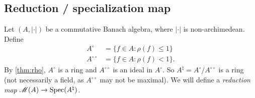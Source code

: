 \subsection{Reduction / specialization map}

Let $(A,|\cdot|)$ be a commutative Banach algebra, where $|\cdot|$ is 
non-archimedean. Define 
\begin{align*}
	A^\circ &= \{f\in A\colon \rho(f)\leqslant 1\} \\
	A^{\circ\circ} &= \{f\in A\colon \rho(f)<1\} .
\end{align*}
By \autoref{thm:rho}, $A^\circ$ is a ring and $A^{\circ\circ}$ is an ideal in 
$A^\circ$. So $A^\natural=A^\circ/A^{\circ\circ}$ is a ring (not necessarily a 
field, as $A^{\circ\circ}$ may not be maximal). We will define a \emph{reduction 
map} $\operatorname{\mathscr{M}}(A)\to \operatorname{Spec}(A^\natural)$. 
